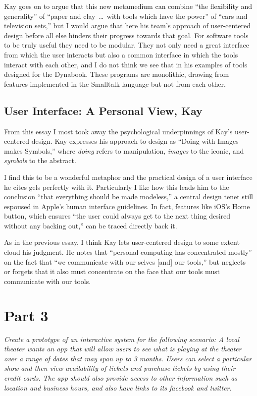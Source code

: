 \documentclass{abrice}
\begin{document}
Kay goes on to argue that this new metamedium can combine ``the flexibility and
generality'' of ``paper and clay\, \ldots\ with tools which have the power'' of
``cars and television sets,'' but I would argue that here his team's approach of
user-centered design before all else hinders their progress towards that goal.
For software tools to be truly useful they need to be modular. They not only
need a great interface from which the user interacts but also a common interface
in which the tools interact with each other, and I do not think we see that in
his examples of tools designed for the Dynabook. These programs are monolithic,
drawing from features implemented in the Smalltalk language but not from each
other.

\subsection{User Interface: A Personal View, Kay}

From this essay I most took away the psychological underpinnings of Kay's
user-centered design. Kay expresses his approach to design as ``Doing with
Images makes Symbols,'' where \emph{doing} refers to manipulation, \emph{images}
to the iconic, and \emph{symbols} to the abstract.

I find this to be a wonderful metaphor and the practical design of a user
interface he cites gels perfectly with it. Particularly I like how this leads
him to the conclusion ``that everything should be made modeless,''
 a central
design tenet still espoused in Apple's human interface guidelines. In fact,
features like iOS's Home button, which ensures ``the user could always get to
the next thing desired without any backing out,'' can be traced directly back
it.

As in the previous essay, I think Kay lets user-centered design to some extent
cloud his judgment. He notes that ``personal computing has concentrated mostly''
on the fact that ``we communicate with our selves [and] our tools,'' but
neglects or forgets that it also must concentrate on the face that our tools
must communicate with our tools.

\section{Part 3}

\emph{Create a prototype of an interactive system for the following scenario: A
  local theater wants an app that will allow users to see what is playing at the
  theater over a range of dates that may span up to 3 months. Users can select
  a particular show and then view availability of tickets and purchase tickets
  by using their credit cards.  The app should also provide access to other
  information such as location and business hours, and also have links to its
  facebook and twitter.}
\end{document}

